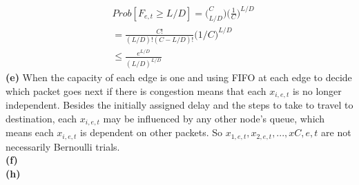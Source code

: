 \documentclass{article}
\begin{document}
\begin{align*}
&Prob[F_{e,t} \geq L/D] = \big(_{L/D}^C)\big(\frac{1}{C})^{L/D} \\
&=\frac{C!}{(L/D)!(C - L/D)!}\big(1/C)^{L/D}\\
&\leq \frac{e^{L/D}}{(L/D)^{L/D}}
\end{align*}\newline
\textbf{(e)} When the capacity of each edge is one and using FIFO at each edge to decide which packet goes next if there is congestion means that each $x_{i,e,t}$ is no longer independent. Besides the initially assigned delay and the steps to take to travel to destination, each $x_{i,e,t}$ may be influenced by any other node's queue, which means each $x_{i,e,t}$ is dependent on other packets. So $x_{1,e,t}, x_{2,e,t}, ... , x{C,e,t}$ are not necessarily Bernoulli trials.\\ \newline
\textbf{(f)} \\ \newline
\textbf{(h)} \\ \newline
\end{document}
